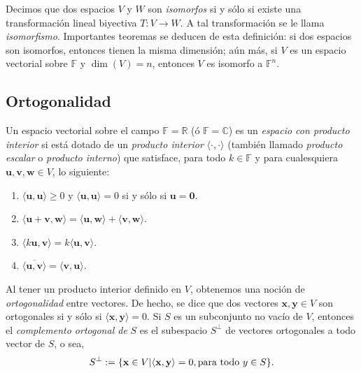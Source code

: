             Decimos que dos espacios $V$ y $W$ son \textit{isomorfos}  si y sólo si existe una transformación lineal biyectiva $T \colon V \rightarrow W$. A tal transformación se le llama \textit{isomorfismo}. Importantes teoremas se deducen de esta definición: si dos espacios son isomorfos, entonces tienen la misma dimensión; aún más, si $V$ es un espacio vectorial sobre $\mathbb{F}$ y $\dim(V) =n$, entonces $V$ es isomorfo a $\mathbb{F}^{n}$.


        \subsection{Ortogonalidad}
            Un espacio vectorial sobre el campo $\mathbb{F}=\mathbb{R}$ (ó $\mathbb{F}=\mathbb{C}$) es un \textit{espacio con producto interior} si está dotado de un \textit{producto interior} $\langle \cdot{,} \cdot \rangle$ (también llamado \textit{producto escalar} o \textit{producto interno}) que satisface, para todo $k \in \mathbb{F}$ y para cualesquiera $\mathbf{u,v,w} \in V$, lo siguiente:
                \begin{enumerate}
                    \item $\langle \mathbf{u,u}\rangle \geq 0$ y $\langle \mathbf{u,u}\rangle = 0$ si y sólo si $\mathbf{u} = \mathbf{0}$.
                    \item $\langle \mathbf{u+v,w} \rangle = \langle \mathbf{u,w} \rangle + \langle \mathbf{v,w}\rangle$.
                    \item $ \langle k\mathbf{u,v}\rangle =  k\langle \mathbf{u,v}\rangle$.
                    \item $\overline{ \langle \mathbf{u,v}\rangle} =  \langle \mathbf{v,u}\rangle$.
                \end{enumerate}


            Al tener un producto interior definido en $V$, obtenemos una noción de \textit{ortogonalidad} entre vectores. De hecho, se dice que dos vectores $\mathbf{x,y} \in V$ son ortogonales si y sólo si $ \langle \mathbf{x,y}\rangle =0$. Si $S$ es un subconjunto no vacío de $V$, entonces el \textit{complemento ortogonal de} $S$ es el subespacio $S^{\perp}$ de vectores ortogonales a todo vector de $S$, o sea, $$S^{\perp}:= \{\mathbf{x} \in V |  \langle \mathbf{x,y}\rangle = 0, \textnormal{para todo } y \in S\}.$$
            
